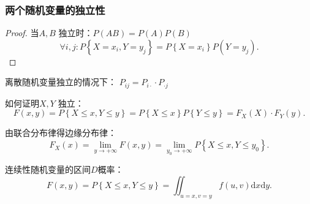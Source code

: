 \subsubsection*{两个随机变量的独立性}%
\label{subsub:两个随机变量的独立性}
\begin{proof}
    当$A,B$ 独立时：$P\left( AB \right) =P\left( A \right) P\left( B \right) $ 
    \[
        \forall i,j: P\left\{ X=x_{i},Y=y_{j} \right\} =P\left\{ X=x_{i} \right\} P\left( Y=y_{j} \right) 
    .\] 
\end{proof}
\begin{notation}
    离散随机变量独立的情况下：
    $P_{ij}=P_{i\cdot }\cdot P_{\cdot j}$ 

    如何证明$X,Y$ 独立：\[
        F\left( x,y \right) =P\left\{ X\le x,Y\le y \right\} =P\left\{ X\le x \right\} P\left\{ Y\le y \right\} =F_{X}\left( X \right) \cdot F_{Y}\left( y \right) 
    .\] 
\end{notation}
由联合分布律得边缘分布律：\[
    F_{X}\left( x \right) =\lim_{y \to +\infty} F\left( x,y \right) =\lim_{y_0 \to +\infty} P\left\{ X\le x,Y\le y_0 \right\} 
.\] 
\begin{notation}
    连续性随机变量的区间$D$概率：\[
        F\left( x,y \right) =P\left\{ X\le x,Y\le y \right\} =\iint_{u=x,v=y} f\left( u,v \right)  \mathrm{d}x\mathrm{d}y
    .\] 
\end{notation}

